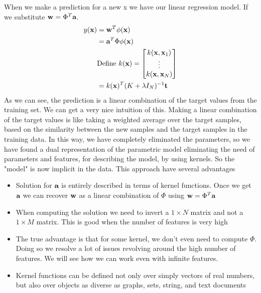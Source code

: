 \documentclass[main.tex]{subfiles}
\begin{document}
When we make a prediction for a new x we have our linear regression model. If we substitute $\textbf{w}=\Phi^T \textbf{a}$.
\begin{align*}
    y(\textbf{x}) &= \textbf{w}^T\phi(\textbf{x}) \\
    &= \textbf{a}^T\Phi \phi(\textbf{x}) \\
    &\text{Define }k(\textbf{x})=
    \begin{bmatrix}
    k(\textbf{x},\textbf{x}_1) \\
    \vdots \\
    k(\textbf{x},\textbf{x}_N)
    \end{bmatrix} \\
    &= k(\textbf{x})^T (K + \lambda I_N)^{-1} \textbf{t}
\end{align*}
As we can see, the prediction is a linear combination of the target values from the training set. We can get a very nice intuition of this. Making a linear combination of the target values is like taking a weighted average over the target samples, based on the similarity between the new samples and the target samples in the training data. In this way, we have completely eliminated the parameters, so we have found a dual representation of the parametric model eliminating the need of parameters and features, for describing the model, by using kernels. So the "model" is now implicit in the data.
This approach have several advantages
\begin{itemize}
    \item Solution for $\textbf{a}$ is entirely described in terms of kernel functions. Once we get $\textbf{a}$ we can recover $\textbf{w}$ as a linear combination of $\Phi$ using $\textbf{w} = \Phi^T \textbf{a}$
    \item When computing the solution we need to invert a $1 \times N$ matrix and not a $1 \times M$ matrix. This is good when the number of features is very high
    \item The true advantage is that for some kernel, we don't even need to compute $\Phi$. Doing so we resolve a lot of issues revolving around the high number of features. We will see how we can work even with infinite features.
    \item Kernel functions can be defined not only over simply vectors of real numbers, but also over objects as diverse as graphs, sets, string, and text documents
\end{itemize}
\end{document}
